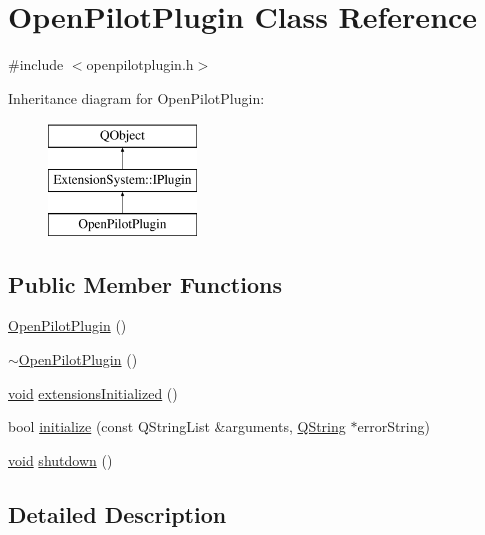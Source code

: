 \hypertarget{class_open_pilot_plugin}{\section{Open\-Pilot\-Plugin Class Reference}
\label{class_open_pilot_plugin}
}


{\ttfamily \#include $<$openpilotplugin.\-h$>$}

Inheritance diagram for Open\-Pilot\-Plugin\-:\begin{figure}[H]
\begin{center}
\leavevmode
\includegraphics[height=3.000000cm]{class_open_pilot_plugin}
\end{center}
\end{figure}
\subsection*{Public Member Functions}
\begin{DoxyCompactItemize}
\item 
\hyperlink{group___boards___open_pilot_plugin_ga3f890f5e776f6d5a0f6f23dd2d4976c9}{Open\-Pilot\-Plugin} ()
\item 
\hyperlink{group___boards___open_pilot_plugin_gaa7eeef25853bb55d85427e94ceff9fa2}{$\sim$\-Open\-Pilot\-Plugin} ()
\item 
\hyperlink{group___u_a_v_objects_plugin_ga444cf2ff3f0ecbe028adce838d373f5c}{void} \hyperlink{group___boards___open_pilot_plugin_gab3fcd8373403dc09fc4d868fdb8f5d23}{extensions\-Initialized} ()
\item 
bool \hyperlink{group___boards___open_pilot_plugin_ga542bd2673508b0755f349632da3bd145}{initialize} (const Q\-String\-List \&arguments, \hyperlink{group___u_a_v_objects_plugin_gab9d252f49c333c94a72f97ce3105a32d}{Q\-String} $\ast$error\-String)
\item 
\hyperlink{group___u_a_v_objects_plugin_ga444cf2ff3f0ecbe028adce838d373f5c}{void} \hyperlink{group___boards___open_pilot_plugin_gab41fd915d672acefc699cd2185ac1037}{shutdown} ()
\end{DoxyCompactItemize}


\subsection{Detailed Description}


